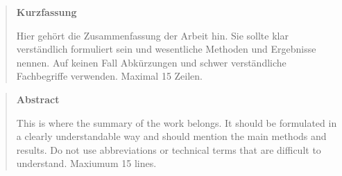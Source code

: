 \vspace*{2cm}

\begin{abstract}
\begin{center}
\normalsize \textbf{Kurzfassung}\\
\end{center}
\vspace{0.2cm}
\noindent
Hier gehört die Zusammenfassung der Arbeit hin. Sie sollte klar verständlich formuliert sein und wesentliche Methoden und Ergebnisse nennen. Auf keinen Fall Abkürzungen und schwer verständliche Fachbegriffe verwenden. Maximal 15 Zeilen. 
\end{abstract}

\vspace{2cm}
\begin{abstract}
\begin{center}
\normalsize \textbf{Abstract}\\
\end{center}
\vspace{0.2cm}
\noindent
This is where the summary of the work belongs. It should be formulated in a clearly understandable way and should mention the main methods and results. Do not use abbreviations or technical terms that are difficult to understand. Maxiumum 15 lines.
\end{abstract}


